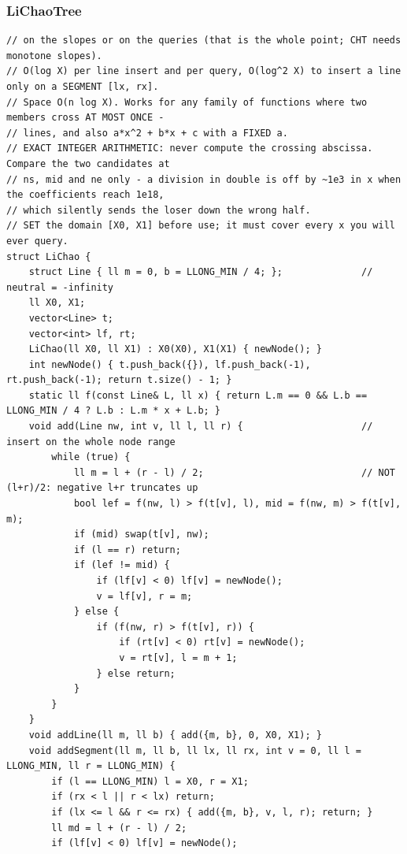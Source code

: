 \documentclass[9pt,a4paper,twocolumn]{extarticle}
\begin{document}
\subsubsection{LiChaoTree}
\nopagebreak
\begin{lstlisting}
// on the slopes or on the queries (that is the whole point; CHT needs monotone slopes).
// O(log X) per line insert and per query, O(log^2 X) to insert a line only on a SEGMENT [lx, rx].
// Space O(n log X). Works for any family of functions where two members cross AT MOST ONCE -
// lines, and also a*x^2 + b*x + c with a FIXED a.
// EXACT INTEGER ARITHMETIC: never compute the crossing abscissa. Compare the two candidates at
// ns, mid and ne only - a division in double is off by ~1e3 in x when the coefficients reach 1e18,
// which silently sends the loser down the wrong half.
// SET the domain [X0, X1] before use; it must cover every x you will ever query.
struct LiChao {
    struct Line { ll m = 0, b = LLONG_MIN / 4; };              // neutral = -infinity
    ll X0, X1;
    vector<Line> t;
    vector<int> lf, rt;
    LiChao(ll X0, ll X1) : X0(X0), X1(X1) { newNode(); }
    int newNode() { t.push_back({}), lf.push_back(-1), rt.push_back(-1); return t.size() - 1; }
    static ll f(const Line& L, ll x) { return L.m == 0 && L.b == LLONG_MIN / 4 ? L.b : L.m * x + L.b; }
    void add(Line nw, int v, ll l, ll r) {                     // insert on the whole node range
        while (true) {
            ll m = l + (r - l) / 2;                            // NOT (l+r)/2: negative l+r truncates up
            bool lef = f(nw, l) > f(t[v], l), mid = f(nw, m) > f(t[v], m);
            if (mid) swap(t[v], nw);
            if (l == r) return;
            if (lef != mid) {
                if (lf[v] < 0) lf[v] = newNode();
                v = lf[v], r = m;
            } else {
                if (f(nw, r) > f(t[v], r)) {
                    if (rt[v] < 0) rt[v] = newNode();
                    v = rt[v], l = m + 1;
                } else return;
            }
        }
    }
    void addLine(ll m, ll b) { add({m, b}, 0, X0, X1); }
    void addSegment(ll m, ll b, ll lx, ll rx, int v = 0, ll l = LLONG_MIN, ll r = LLONG_MIN) {
        if (l == LLONG_MIN) l = X0, r = X1;
        if (rx < l || r < lx) return;
        if (lx <= l && r <= rx) { add({m, b}, v, l, r); return; }
        ll md = l + (r - l) / 2;
        if (lf[v] < 0) lf[v] = newNode();

\end{lstlisting}
\end{document}
